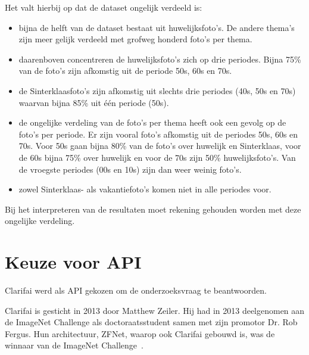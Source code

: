 Het valt hierbij op dat de dataset ongelijk verdeeld is:
\begin{itemize}
	\item bijna de helft van de dataset bestaat uit huwelijksfoto’s. De andere thema’s zijn meer gelijk verdeeld met grofweg honderd foto’s per thema. 
	\item daarenboven concentreren de huwelijksfoto’s zich op drie periodes. Bijna 75\% van de foto’s zijn afkomstig uit de periode 50s, 60s en 70s. 
	\item de Sinterklaasfoto’s zijn afkomstig uit slechts drie periodes (40s, 50s en 70s) waarvan bijna 85\% uit één periode (50s).
	\item de ongelijke verdeling van de foto’s per thema heeft ook een gevolg op de foto’s per periode. Er zijn vooral foto’s afkomstig uit de periodes 50s, 60s en 70s. Voor 50s gaan bijna 80\% van de foto’s over huwelijk en Sinterklaas, voor de 60s bijna 75\% over huwelijk en voor de 70s zijn 50\% huwelijksfoto’s. Van de vroegste periodes (00s en 10s) zijn dan weer weinig foto’s. 
	\item zowel Sinterklaas- als vakantiefoto’s komen niet in alle periodes voor.
\end{itemize}

Bij het interpreteren van de resultaten moet rekening gehouden worden met deze ongelijke verdeling.

\section{Keuze voor API}
\label{sec:keuze-voor-api}

Clarifai werd als API gekozen om de onderzoeksvraag te beantwoorden. 

Clarifai is gesticht in 2013 door Matthew Zeiler. Hij had in 2013 deelgenomen aan de ImageNet Challenge als doctoraatsstudent samen met zijn promotor Dr. Rob Fergus. Hun architectuur, ZFNet, waarop ook Clarifai gebouwd is, was de winnaar van de ImageNet Challenge~\autocite{Tsang2018}.

